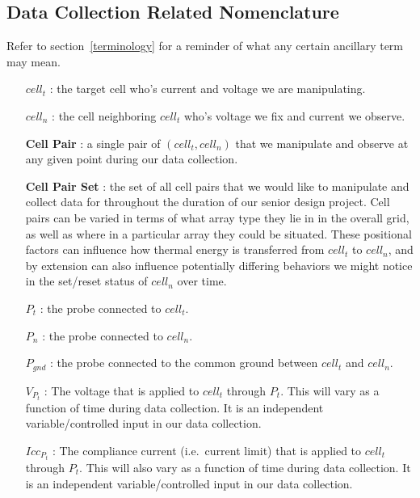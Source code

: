 \documentclass{article}
\begin{document}
      \subsection{Data Collection Related Nomenclature} \label{nomenclature}

        Refer to section~\ref{terminology} for a reminder of what any certain ancillary term may mean.

        \begin{enumerate}
          \item [\textbf{$cell_t$} :] the target cell who's current and voltage we are manipulating.
          \item [\textbf{$cell_n$} :] the cell neighboring $cell_t$ who's voltage we fix and current we observe.
          \item [\textbf{Cell Pair} :] a single pair of $(cell_t, cell_n)$ that we manipulate and observe at any given
            point during our data collection.
          \item [\textbf{Cell Pair Set} :] the set of all cell pairs that we would like to manipulate and collect data
            for throughout the duration of our senior design project. Cell pairs can be varied in terms of what array
            type they lie in in the overall grid, as well as where in a particular array they could be situated. These
            positional factors can influence how thermal energy is transferred from $cell_t$ to $cell_n$, and by
            extension can also influence potentially differing behaviors we might notice in the set/reset status of
            $cell_n$ over time.
          \item [\textbf{$P_t$} :] the probe connected to $cell_t$.
          \item [\textbf{$P_n$} :] the probe connected to $cell_n$.
          \item [\textbf{$P_{gnd}$} :] the probe connected to the common ground between $cell_t$ and $cell_n$.
          \item [\textbf{$V_{P_t}$} :] The voltage that is applied to $cell_t$ through $P_t$. This will vary as a
            function of time during data collection. It is an independent variable/controlled input in our data
            collection.
          \item [\textbf{$Icc_{P_t}$} :] The compliance current (i.e.\ current limit) that is applied to $cell_t$
            through $P_t$. This will also vary as a function of time during data collection. It is an independent
            variable/controlled input in our data collection.

\end{enumerate}
\end{document}
